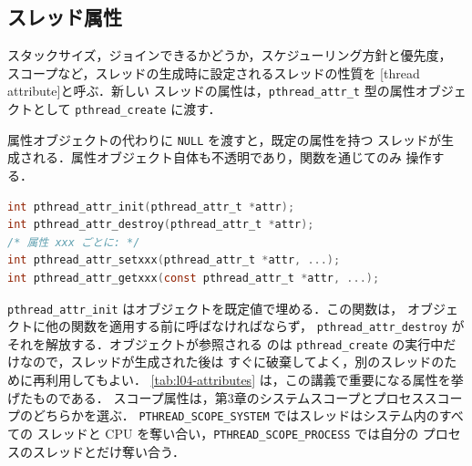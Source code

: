 \documentclass[../main.tex]{subfiles}
\begin{document}
\subsection{スレッド属性}
\label{sec:l04-attr}

\begin{definition}[スレッド属性]
  スタックサイズ，ジョインできるかどうか，スケジューリング方針と優先度，
  スコープなど，スレッドの生成時に設定されるスレッドの性質を
  [thread attribute]と呼ぶ．新しい
  スレッドの属性は，\texttt{pthread\_attr\_t} 型の属性オブジェクトとして
  \texttt{pthread\_create} に渡す．
\end{definition}

属性オブジェクトの代わりに \texttt{NULL} を渡すと，既定の属性を持つ
スレッドが生成される．属性オブジェクト自体も不透明であり，関数を通じてのみ
操作する．
\begin{lstlisting}[language=C, numbers=none]
int pthread_attr_init(pthread_attr_t *attr);
int pthread_attr_destroy(pthread_attr_t *attr);
/* 属性 xxx ごとに: */
int pthread_attr_setxxx(pthread_attr_t *attr, ...);
int pthread_attr_getxxx(const pthread_attr_t *attr, ...);
\end{lstlisting}
\texttt{pthread\_attr\_init} はオブジェクトを既定値で埋める．この関数は，
オブジェクトに他の関数を適用する前に呼ばなければならず，
\texttt{pthread\_attr\_destroy} がそれを解放する．オブジェクトが参照される
のは \texttt{pthread\_create} の実行中だけなので，スレッドが生成された後は
すぐに破棄してよく，別のスレッドのために再利用してもよい．
\cref{tab:l04-attributes} は，この講義で重要になる属性を挙げたものである．
スコープ属性は，第3章のシステムスコープとプロセススコープのどちらかを選ぶ．
\texttt{PTHREAD\_SCOPE\_SYSTEM} ではスレッドはシステム内のすべての
スレッドと CPU を奪い合い，\texttt{PTHREAD\_SCOPE\_PROCESS} では自分の
プロセスのスレッドとだけ奪い合う．%
\end{document}
